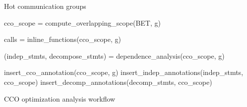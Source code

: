 \begin{algorithm}
{\scriptsize
\begin{algorithmic}[1]
\Require Hot communication groups
\nolineno

    \State cco\_scope = compute\_overlapping\_scope(BET, g)
    \nolineno

    \State calls = inline\_functions(cco\_scope, g)
    \nolineno

    \State (indep\_stmts, decompose\_stmts) = dependence\_analysis(cco\_scope, g)
    \nolineno




    \State insert\_cco\_annotation(cco\_scope, g)
    \nolineno
    \State insert\_indep\_annotations(indep\_stmts, cco\_scope)
    \State insert\_decomp\_annotations(decomp\_stmts, cco\_scope)
  \EndFor
\EndFunction
\resetlineno
\end{algorithmic}
\caption{CCO optimization analysis workflow}
\label{alg:analysis}
}%
\end{algorithm}

